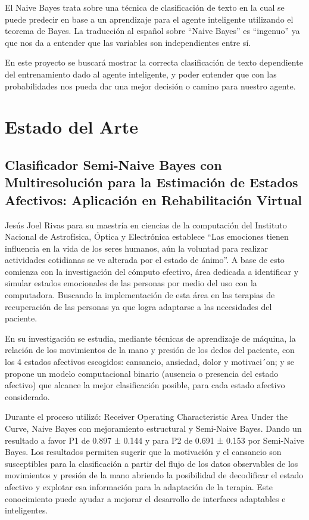 \documentclass[sigconf]{acmart}
\begin{document}
El Naive Bayes trata sobre una técnica de clasificación de texto en la cual se puede predecir en base a un aprendizaje para el agente inteligente utilizando el teorema de Bayes. La traducción al español sobre “Naive Bayes” es “ingenuo” ya que nos da a entender que las variables son independientes entre sí.

En este proyecto se buscará mostrar la correcta clasificación de texto dependiente del entrenamiento dado al agente inteligente, y poder entender que con las probabilidades nos pueda dar una mejor decisión o camino para nuestro agente.\citep{Space}
\section{Estado del Arte}
\subsection{Clasificador Semi-Naive Bayes con Multiresolución para la Estimación de Estados Afectivos: Aplicación en Rehabilitación Virtual}
Jesús Joel Rivas para su maestría en ciencias de la computación del Instituto Nacional de Astrofísica, Óptica y Electrónica establece “Las emociones tienen influencia en la vida de los seres humanos, aún la voluntad para realizar actividades cotidianas se ve alterada por el estado de ánimo”. A base de esto comienza con la investigación del cómputo efectivo, área dedicada a identificar y simular estados emocionales de las personas por medio del uso con la computadora. Buscando la implementación de esta área en las terapias de recuperación de las personas ya que logra adaptarse a las necesidades del paciente.

En su investigación se estudia, mediante técnicas de aprendizaje de máquina, la relación de los movimientos de la mano y presión de los dedos del paciente, con los 4 estados afectivos escogidos: cansancio, ansiedad, dolor y motivaci´on; y se propone un modelo computacional binario (ausencia o presencia del estado afectivo) que alcance la mejor clasificación posible, para cada estado afectivo considerado.

Durante el proceso utilizó: Receiver Operating Characteristic Area Under the Curve, Naive Bayes con mejoramiento estructural y Semi-Naive Bayes. Dando un resultado a favor P1 de 0.897 ± 0.144 y para P2 de 0.691 ± 0.153 por Semi-Naive Bayes. Los resultados permiten sugerir que la motivación y el cansancio son susceptibles para la clasificación a partir del flujo de los datos observables de los movimientos y presión de la mano abriendo la posibilidad de decodificar el estado afectivo y explotar esa información para la adaptación de la terapia. Este conocimiento puede ayudar a mejorar el desarrollo de interfaces adaptables e inteligentes.\citep{Lee}\citep{Lopez}
\end{document}
